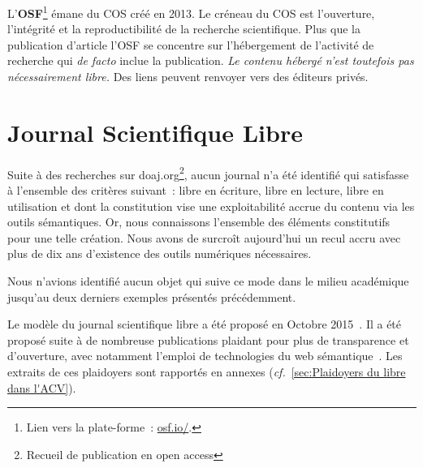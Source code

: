 L'\textbf{\gls{OSF}}\footnote{Lien vers la plate-forme~: \href{https://osf.io/}{osf.io/}.} émane du \gls{COS} créé en 2013.
Le créneau du \gls{COS} est l'ouverture, l'intégrité et la reproductibilité de la recherche scientifique.
Plus que la publication d'article l'\gls{OSF} se concentre sur l'hébergement de l'activité de recherche qui \textit{de facto} inclue la publication.
\emph{Le contenu hébergé n'est toutefois pas nécessairement libre.}
Des liens peuvent renvoyer vers des éditeurs privés.

\section{Journal Scientifique Libre}
\label{sec:JSL}

Suite à des recherches sur doaj.org\footnote{Recueil de publication en open access}, aucun journal n'a été identifié qui satisfasse à l'ensemble des critères suivant~: libre en écriture, libre en lecture, libre en utilisation et dont la constitution vise une exploitabilité accrue du contenu via les outils sémantiques.
Or, nous connaissons l'ensemble des éléments constitutifs pour une telle création.
Nous avons de surcroît aujourd'hui un recul accru avec plus de dix ans d’existence des outils numériques nécessaires.

Nous n'avions identifié aucun objet qui suive ce mode dans le milieu académique jusqu'au deux derniers exemples présentés précédemment.

Le modèle du journal scientifique libre a été proposé en Octobre 2015~\cite{patard_proposal_2015}.
Il a été proposé suite à de nombreuse publications plaidant pour plus de transparence et d'ouverture, avec notamment l'emploi de technologies du web sémantique~\cite{borkum_health_2014,zhang_lca-oriented_2015,davis_making_2012,mutel_ideas_2014,masanet_reflections_2014,lamela_footprinted._2011,sayan_contribution_2011,belleau_bio2rdf:_2008,perez_role_2014,ingwersen_new_2015,weidema_bonsai_2014,ciroth_ict_2007,funtowicz_science_1993,logan_ten_2010,bonanni_open_2010,madlberger_development_2013}.
Les extraits de ces plaidoyers sont rapportés en annexes (\textit{cf.}~\ref{sec:Plaidoyers du libre dans l'ACV}).  

